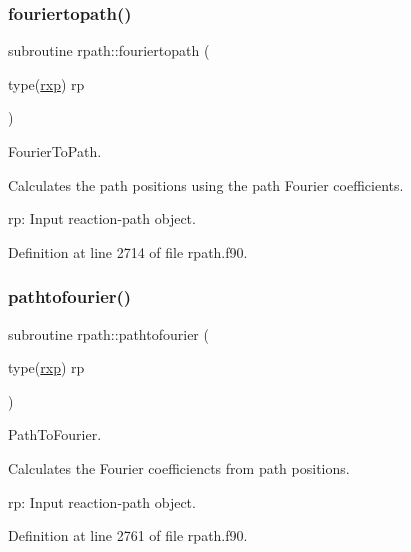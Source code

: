 \subsubsection{\texorpdfstring{fouriertopath()}{fouriertopath()}}
{\footnotesize\ttfamily subroutine rpath\+::fouriertopath (\begin{DoxyParamCaption}\item[{type(\mbox{\hyperlink{structrpath_1_1rxp}{rxp}})}]{rp }\end{DoxyParamCaption})}



Fourier\+To\+Path. 

Calculates the path positions using the path Fourier coefficients.


\begin{DoxyItemize}
\item rp\+: Input reaction-\/path object. 
\end{DoxyItemize}

Definition at line 2714 of file rpath.\+f90.

\mbox{\label{namespacerpath_a58f6e30e1af43edf4aa86279c520213f}} 
\subsubsection{\texorpdfstring{pathtofourier()}{pathtofourier()}}
{\footnotesize\ttfamily subroutine rpath\+::pathtofourier (\begin{DoxyParamCaption}\item[{type(\mbox{\hyperlink{structrpath_1_1rxp}{rxp}})}]{rp }\end{DoxyParamCaption})}



Path\+To\+Fourier. 

Calculates the Fourier coefficiencts from path positions.


\begin{DoxyItemize}
\item rp\+: Input reaction-\/path object. 
\end{DoxyItemize}

Definition at line 2761 of file rpath.\+f90.

\mbox{\label{namespacerpath_aa76074b978980fcf3419586f037a4385}} 
